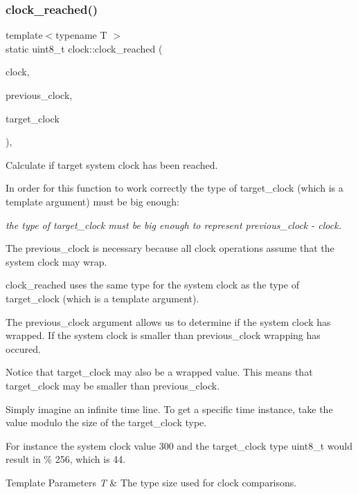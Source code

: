 \subsubsection{\texorpdfstring{clock\+\_\+reached()}{clock\_reached()}\hspace{0.1cm}{\footnotesize\ttfamily [1/3]}}
{\footnotesize\ttfamily template$<$typename T $>$ \\
static uint8\+\_\+t clock\+::clock\+\_\+reached (\begin{DoxyParamCaption}\item[{const T \&}]{clock,  }\item[{const T \&}]{previous\+\_\+clock,  }\item[{const T \&}]{target\+\_\+clock }\end{DoxyParamCaption})\hspace{0.3cm}{\ttfamily [inline]}, {\ttfamily [static]}}



Calculate if target system clock has been reached. 

In order for this function to work correctly the type of target\+\_\+clock (which is a template argument) must be big enough\+:

{\itshape the type of target\+\_\+clock must be big enough to represent {\ttfamily previous\+\_\+clock -\/ clock}.}

The previous\+\_\+clock is necessary because all clock operations assume that the system clock may wrap.

clock\+\_\+reached uses the same type for the system clock as the type of target\+\_\+clock (which is a template argument).

The previous\+\_\+clock argument allows us to determine if the system clock has wrapped. If the system clock is smaller than previous\+\_\+clock wrapping has occured.

Notice that target\+\_\+clock may also be a wrapped value. This means that target\+\_\+clock may be smaller than previous\+\_\+clock.

Simply imagine an infinite time line. To get a specific time instance, take the value modulo the size of the target\+\_\+clock type.

For instance the system clock value 300 and the target\+\_\+clock type uint8\+\_\+t would result in { \% 256}, which is 44.


\begin{DoxyTemplParams}{Template Parameters}
{\em T} & The type size used for clock comparisons. \\
\hline
\end{DoxyTemplParams}

